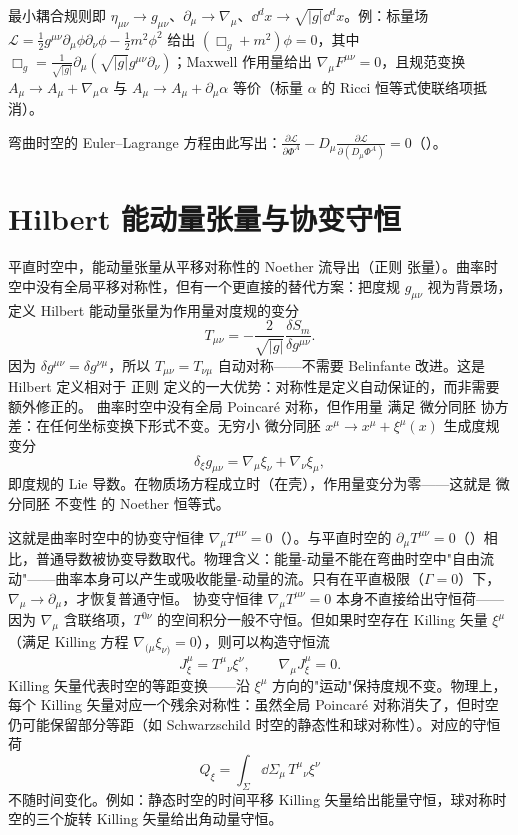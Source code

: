 最小耦合规则即 $\eta_{\mu\nu}\to g_{\mu\nu}$、$\partial_\mu\to\nabla_\mu$、$\dd^dx\to\sqrt{|g|}\dd^dx$。例：标量场 $\mathcal{L}=\frac12g^{\mu\nu}\partial_\mu\phi\partial_\nu\phi-\frac12m^2\phi^2$ 给出 $(\Box_g+m^2)\phi=0$，其中 $\Box_g=\frac1{\sqrt{|g|}}\partial_\mu(\sqrt{|g|}g^{\mu\nu}\partial_\nu)$；Maxwell 作用量给出 $\nabla_\mu F^{\mu\nu}=0$，且规范变换 $A_\mu\to A_\mu+\nabla_\mu\alpha$ 与 $A_\mu\to A_\mu+\partial_\mu\alpha$ 等价（标量 $\alpha$ 的 Ricci 恒等式使联络项抵消）。

弯曲时空的 Euler--Lagrange 方程由此写出：$\frac{\partial\mathcal L}{\partial\Phi^A}-D_\mu\frac{\partial\mathcal L}{\partial(D_\mu\Phi^A)}=0$（）。

\section{Hilbert 能动量张量与协变守恒}
平直时空中，能动量张量从平移对称性的 Noether 流导出（正则 张量）。曲率时空中没有全局平移对称性，但有一个更直接的替代方案：把度规 $g_{\mu\nu}$ 视为背景场，定义 Hilbert 能动量张量为作用量对度规的变分
\begin{equation}\label{eq:ms-curved-T-hilbert}
{
T_{\mu\nu}=-\frac{2}{\sqrt{|g|}}\frac{\delta S_m}{\delta g^{\mu\nu}}.
}
\end{equation}
因为 $\delta g^{\mu\nu}=\delta g^{\nu\mu}$，所以 $T_{\mu\nu}=T_{\nu\mu}$ 自动对称——不需要 Belinfante 改进。这是 Hilbert 定义相对于 正则 定义的一大优势：对称性是定义自动保证的，而非需要额外修正的。
曲率时空中没有全局 Poincaré 对称，但作用量 满足 微分同胚 协方差：在任何坐标变换下形式不变。无穷小 微分同胚 $x^\mu\to x^\mu+\xi^\mu(x)$ 生成度规变分
\begin{equation*}
\delta_\xi g_{\mu\nu}=\nabla_\mu\xi_\nu+\nabla_\nu\xi_\mu,
\end{equation*}
即度规的 Lie 导数。在物质场方程成立时（在壳），作用量变分为零——这就是 微分同胚 不变性 的 Noether 恒等式。

这就是曲率时空中的协变守恒律 $\nabla_\mu T^{\mu\nu}=0$（）。与平直时空的 $\partial_\mu T^{\mu\nu}=0$（）相比，普通导数被协变导数取代。物理含义：能量-动量不能在弯曲时空中"自由流动"——曲率本身可以产生或吸收能量-动量的流。只有在平直极限（$\Gamma=0$）下，$\nabla_\mu\to\partial_\mu$，才恢复普通守恒。
协变守恒律 $\nabla_\mu T^{\mu\nu}=0$ 本身不直接给出守恒荷——因为 $\nabla_\mu$ 含联络项，$T^{0\nu}$ 的空间积分一般不守恒。但如果时空存在 Killing 矢量 $\xi^\mu$（满足 Killing 方程 $\nabla_{(\mu}\xi_{\nu)}=0$），则可以构造守恒流
\begin{equation*}{
J^\mu_\xi=T^\mu{}_\nu\xi^\nu,\qquad \nabla_\mu J^\mu_\xi=0.
}
\end{equation*}
Killing 矢量代表时空的等距变换——沿 $\xi^\mu$ 方向的"运动"保持度规不变。物理上，每个 Killing 矢量对应一个残余对称性：虽然全局 Poincaré 对称消失了，但时空仍可能保留部分等距（如 Schwarzschild 时空的静态性和球对称性）。对应的守恒荷
\begin{equation*}Q_\xi=\int_\Sigma \dd\Sigma_\mu\,T^\mu{}_\nu\xi^\nu
\end{equation*}
不随时间变化。例如：静态时空的时间平移 Killing 矢量给出能量守恒，球对称时空的三个旋转 Killing 矢量给出角动量守恒。


